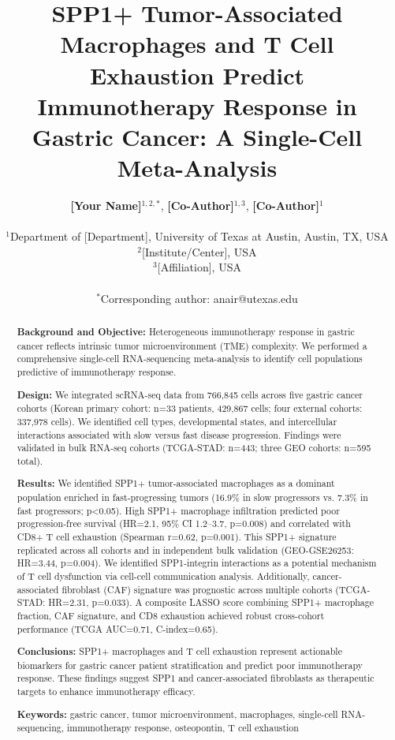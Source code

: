 \documentclass[12pt,twoside]{article}
\title{SPP1+ Tumor-Associated Macrophages and T Cell Exhaustion Predict Immunotherapy Response in Gastric Cancer: A Single-Cell Meta-Analysis}
\author{
    \textbf{[Your Name]}$^{1,2,*}$,
    \textbf{[Co-Author]}$^{1,3}$,
    \textbf{[Co-Author]}$^{1}$ \\
    \\
    $^1$Department of [Department], University of Texas at Austin, Austin, TX, USA \\
    $^2$[Institute/Center], USA \\
    $^3$[Affiliation], USA \\
    \\
    $^*$Corresponding author: anair@utexas.edu
}
\date{}
\begin{document}
\maketitle


\begin{abstract}

\noindent \textbf{Background and Objective:} Heterogeneous immunotherapy response in gastric cancer reflects intrinsic tumor microenvironment (TME) complexity. We performed a comprehensive single-cell RNA-sequencing meta-analysis to identify cell populations predictive of immunotherapy response.

\noindent \textbf{Design:} We integrated scRNA-seq data from 766,845 cells across five gastric cancer cohorts (Korean primary cohort: n=33 patients, 429,867 cells; four external cohorts: 337,978 cells). We identified cell types, developmental states, and intercellular interactions associated with slow versus fast disease progression. Findings were validated in bulk RNA-seq cohorts (TCGA-STAD: n=443; three GEO cohorts: n=595 total).

\noindent \textbf{Results:} We identified SPP1+ tumor-associated macrophages as a dominant population enriched in fast-progressing tumors (16.9\% in slow progressors vs. 7.3\% in fast progressors; p<0.05). High SPP1+ macrophage infiltration predicted poor progression-free survival (HR=2.1, 95\% CI 1.2--3.7, p=0.008) and correlated with CD8+ T cell exhaustion (Spearman r=0.62, p=0.001). This SPP1+ signature replicated across all cohorts and in independent bulk validation (GEO-GSE26253: HR=3.44, p=0.004). We identified SPP1-integrin interactions as a potential mechanism of T cell dysfunction via cell-cell communication analysis. Additionally, cancer-associated fibroblast (CAF) signature was prognostic across multiple cohorts (TCGA-STAD: HR=2.31, p=0.033). A composite LASSO score combining SPP1+ macrophage fraction, CAF signature, and CD8 exhaustion achieved robust cross-cohort performance (TCGA AUC=0.71, C-index=0.65).

\noindent \textbf{Conclusions:} SPP1+ macrophages and T cell exhaustion represent actionable biomarkers for gastric cancer patient stratification and predict poor immunotherapy response. These findings suggest SPP1 and cancer-associated fibroblasts as therapeutic targets to enhance immunotherapy efficacy.

\noindent \textbf{Keywords:} gastric cancer, tumor microenvironment, macrophages, single-cell RNA-sequencing, immunotherapy response, osteopontin, T cell exhaustion

\end{abstract}
\end{document}
